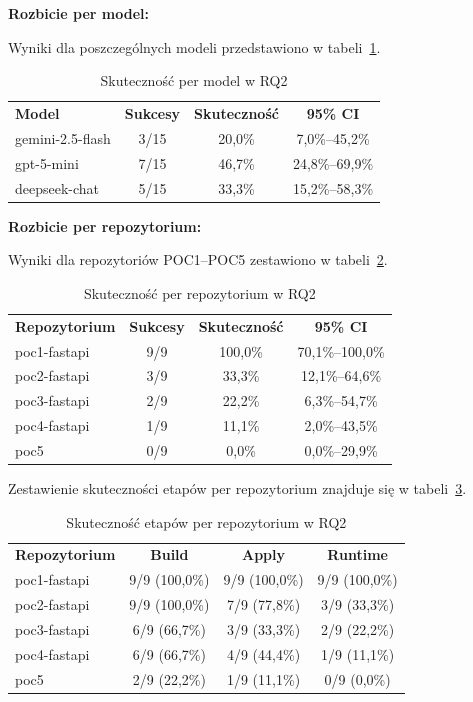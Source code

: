 \textbf{Rozbicie per model:}

Wyniki dla poszczególnych modeli przedstawiono w tabeli~\ref{tab:h2-models}.

\begin{table}[h]
    \centering
    \begin{tabular}{lccc}
        \textbf{Model} & \textbf{Sukcesy} & \textbf{Skuteczność} & \textbf{95\% CI} \\
        gemini-2.5-flash & 3/15 & 20{,}0\% & 7{,}0\%--45{,}2\% \\
        gpt-5-mini & 7/15 & 46{,}7\% & 24{,}8\%--69{,}9\% \\
        deepseek-chat & 5/15 & 33{,}3\% & 15{,}2\%--58{,}3\% \\
    \end{tabular}
    \caption{Skuteczność per model w RQ2}
    \label{tab:h2-models}
\end{table}

\textbf{Rozbicie per repozytorium:}

Wyniki dla repozytoriów POC1--POC5 zestawiono w tabeli~\ref{tab:h2-repos}.

\begin{table}[h]
    \centering
    \begin{tabular}{lccc}
        \textbf{Repozytorium} & \textbf{Sukcesy} & \textbf{Skuteczność} & \textbf{95\% CI} \\
        poc1-fastapi & 9/9 & 100{,}0\% & 70{,}1\%--100{,}0\% \\
        poc2-fastapi & 3/9 & 33{,}3\% & 12{,}1\%--64{,}6\% \\
        poc3-fastapi & 2/9 & 22{,}2\% & 6{,}3\%--54{,}7\% \\
        poc4-fastapi & 1/9 & 11{,}1\% & 2{,}0\%--43{,}5\% \\
        poc5 & 0/9 & 0{,}0\% & 0{,}0\%--29{,}9\% \\
    \end{tabular}
    \caption{Skuteczność per repozytorium w RQ2}
    \label{tab:h2-repos}
\end{table}

Zestawienie skuteczności etapów per repozytorium znajduje się w tabeli~\ref{tab:h2-repo-stages}.

\begin{table}[h]
    \centering
    \begin{tabular}{lccc}
        \textbf{Repozytorium} & \textbf{Build} & \textbf{Apply} & \textbf{Runtime} \\
        poc1-fastapi & 9/9 (100{,}0\%) & 9/9 (100{,}0\%) & 9/9 (100{,}0\%) \\
        poc2-fastapi & 9/9 (100{,}0\%) & 7/9 (77{,}8\%) & 3/9 (33{,}3\%) \\
        poc3-fastapi & 6/9 (66{,}7\%) & 3/9 (33{,}3\%) & 2/9 (22{,}2\%) \\
        poc4-fastapi & 6/9 (66{,}7\%) & 4/9 (44{,}4\%) & 1/9 (11{,}1\%) \\
        poc5 & 2/9 (22{,}2\%) & 1/9 (11{,}1\%) & 0/9 (0{,}0\%) \\
    \end{tabular}
    \caption{Skuteczność etapów per repozytorium w RQ2}
    \label{tab:h2-repo-stages}
\end{table}

